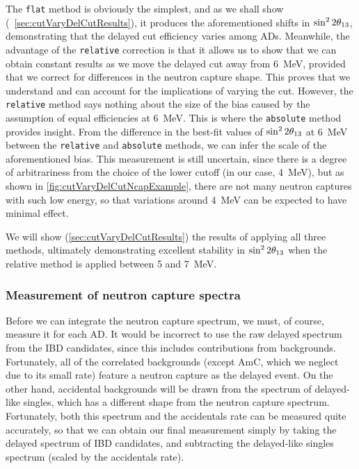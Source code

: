 \documentclass[../thesis.tex]{subfiles}
\begin{document}
The \texttt{flat} method is obviously the simplest, and as we shall show (~\autoref{sec:cutVaryDelCutResults}), it produces the aforementioned shifts in $\sin^2 2\theta_{13}$, demonstrating that the delayed cut efficiency varies among ADs. Meanwhile, the advantage of the \texttt{relative} correction is that it allows us to show that we can obtain constant results as we move the delayed cut away from 6~MeV, provided that we correct for differences in the neutron capture shape. This proves that we understand and can account for the implications of varying the cut. However, the \texttt{relative} method says nothing about the size of the bias caused by the assumption of equal efficiencies at 6~MeV. This is where the \texttt{absolute} method provides insight. From the difference in the best-fit values of $\sin^2 2\theta_{13}$ at 6~MeV between the \texttt{relative} and \texttt{absolute} methods, we can infer the scale of the aforementioned bias. This measurement is still uncertain, since there is a degree of arbitrariness from the choice of the lower cutoff (in our case, 4~MeV), but as shown in \autoref{fig:cutVaryDelCutNcapExample}, there are not many neutron captures with such low energy, so that variations around 4~MeV can be expected to have minimal effect.

We will show (\autoref{sec:cutVaryDelCutResults}) the results of applying all three methods, ultimately demonstrating excellent stability in $\sin^2 2\theta_{13}$ when the relative method is applied between 5 and 7~MeV.

\subsubsection{Measurement of neutron capture spectra}
\label{sec:cutVaryDelCutSpecMeas}

Before we can integrate the neutron capture spectrum, we must, of course, measure it for each AD. It would be incorrect to use the raw delayed spectrum from the IBD candidates, since this includes contributions from backgrounds. Fortunately, all of the correlated backgrounds (except AmC, which we neglect due to its small rate) feature a neutron capture as the delayed event. On the other hand, accidental backgrounds will be drawn from the spectrum of delayed-like singles, which has a different shape from the neutron capture spectrum. Fortunately, both this spectrum and the accidentals rate can be measured quite accurately, so that we can obtain our final measurement simply by taking the delayed spectrum of IBD candidates, and subtracting the delayed-like singles spectrum (scaled by the accidentals rate).
\end{document}

